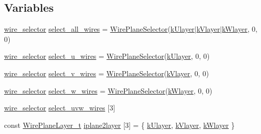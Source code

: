 \subsection*{Variables}
\begin{DoxyCompactItemize}
\item 
\hyperlink{namespace_wire_cell_a9d7058ef4d388953ee9d03ff51509e51}{wire\+\_\+selector} \hyperlink{namespace_wire_cell_aa0c37dd21fca16317dff3f7a052b96bb}{select\+\_\+all\+\_\+wires} = \hyperlink{struct_wire_cell_1_1_wire_plane_selector}{Wire\+Plane\+Selector}(\hyperlink{namespace_wire_cell_a761397ff086f0a7e1a1d9ccd251ac618a4543784e91b7463d50a413e9eaea3229}{k\+Ulayer}$\vert$\hyperlink{namespace_wire_cell_a761397ff086f0a7e1a1d9ccd251ac618ad767a06a96af29d2fd31cbf13f4a1c86}{k\+Vlayer}$\vert$\hyperlink{namespace_wire_cell_a761397ff086f0a7e1a1d9ccd251ac618ac96acb93802a30ef1648ee1c0e81eab1}{k\+Wlayer}, 0, 0)
\item 
\hyperlink{namespace_wire_cell_a9d7058ef4d388953ee9d03ff51509e51}{wire\+\_\+selector} \hyperlink{namespace_wire_cell_a7282c5ddd00793097ad33fae7f82c6a5}{select\+\_\+u\+\_\+wires} = \hyperlink{struct_wire_cell_1_1_wire_plane_selector}{Wire\+Plane\+Selector}(\hyperlink{namespace_wire_cell_a761397ff086f0a7e1a1d9ccd251ac618a4543784e91b7463d50a413e9eaea3229}{k\+Ulayer}, 0, 0)
\item 
\hyperlink{namespace_wire_cell_a9d7058ef4d388953ee9d03ff51509e51}{wire\+\_\+selector} \hyperlink{namespace_wire_cell_a95f0ccbdb40e382cf391a7ee25ca3bd1}{select\+\_\+v\+\_\+wires} = \hyperlink{struct_wire_cell_1_1_wire_plane_selector}{Wire\+Plane\+Selector}(\hyperlink{namespace_wire_cell_a761397ff086f0a7e1a1d9ccd251ac618ad767a06a96af29d2fd31cbf13f4a1c86}{k\+Vlayer}, 0, 0)
\item 
\hyperlink{namespace_wire_cell_a9d7058ef4d388953ee9d03ff51509e51}{wire\+\_\+selector} \hyperlink{namespace_wire_cell_a543ea6901b1d80a4dc43c7bdef156d77}{select\+\_\+w\+\_\+wires} = \hyperlink{struct_wire_cell_1_1_wire_plane_selector}{Wire\+Plane\+Selector}(\hyperlink{namespace_wire_cell_a761397ff086f0a7e1a1d9ccd251ac618ac96acb93802a30ef1648ee1c0e81eab1}{k\+Wlayer}, 0, 0)
\item 
\hyperlink{namespace_wire_cell_a9d7058ef4d388953ee9d03ff51509e51}{wire\+\_\+selector} \hyperlink{namespace_wire_cell_a198de2e1656a8a001632e88fe21384e7}{select\+\_\+uvw\+\_\+wires} \mbox{[}3\mbox{]}
\item 
const \hyperlink{namespace_wire_cell_a761397ff086f0a7e1a1d9ccd251ac618}{Wire\+Plane\+Layer\+\_\+t} \hyperlink{namespace_wire_cell_ae1f5243cecaaeeea6ddd0b5ac75719df}{iplane2layer} \mbox{[}3\mbox{]} = \{ \hyperlink{namespace_wire_cell_a761397ff086f0a7e1a1d9ccd251ac618a4543784e91b7463d50a413e9eaea3229}{k\+Ulayer}, \hyperlink{namespace_wire_cell_a761397ff086f0a7e1a1d9ccd251ac618ad767a06a96af29d2fd31cbf13f4a1c86}{k\+Vlayer}, \hyperlink{namespace_wire_cell_a761397ff086f0a7e1a1d9ccd251ac618ac96acb93802a30ef1648ee1c0e81eab1}{k\+Wlayer} \}
\end{DoxyCompactItemize}


